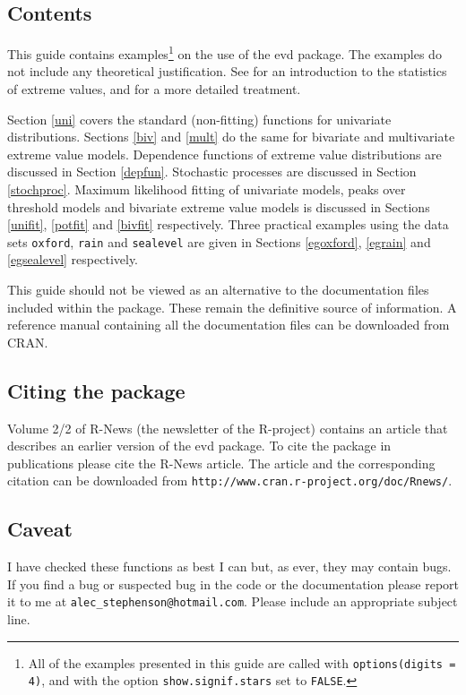 \documentclass[11pt,a4paper]{article}
\begin{document}
\subsection{Contents}

This guide contains examples\footnote{All of the examples presented in
this guide are called with \texttt{options(digits = 4)}, and with the
option \texttt{show.signif.stars} set to \texttt{FALSE}.} on the use
of the evd package. 
The examples do not include any theoretical justification.
See \citet{cole01} for an introduction to the statistics of extreme
values, and \citet{beirgoeg04} for a more detailed treatment. 

Section \ref{uni} covers the standard (non-fitting) functions for
univariate distributions. 
Sections \ref{biv} and \ref{mult} do the same for bivariate and
multivariate extreme value models. 
Dependence functions of extreme value distributions are discussed in
Section \ref{depfun}. 
Stochastic processes are discussed in Section \ref{stochproc}.
Maximum likelihood fitting of univariate models, peaks over threshold
models and bivariate extreme value models is discussed in Sections
\ref{unifit}, \ref{potfit} and \ref{bivfit} respectively. 
Three practical examples using the data sets \verb+oxford+,
\verb+rain+ and \verb+sealevel+ are given in Sections \ref{egoxford},
\ref{egrain} and \ref{egsealevel} respectively. 

This guide should not be viewed as an alternative to the documentation
files included within the package. 
These remain the definitive source of information. 
A reference manual containing all the documentation files can be
downloaded from CRAN. 

\subsection{Citing the package}

Volume 2/2 of R-News (the newsletter of the R-project) contains an
article that describes an earlier version of the evd package. 
To cite the package in publications please cite the R-News article. 
The article and the corresponding citation can be downloaded from
\verb+http://www.cran.r-project.org/doc/Rnews/+.

\subsection{Caveat}

I have checked these functions as best I can but, as ever, they may
contain bugs. 
If you find a bug or suspected bug in the code or the documentation
please report it to me at \verb+alec_stephenson@hotmail.com+.  
Please include an appropriate subject line.
\end{document}
